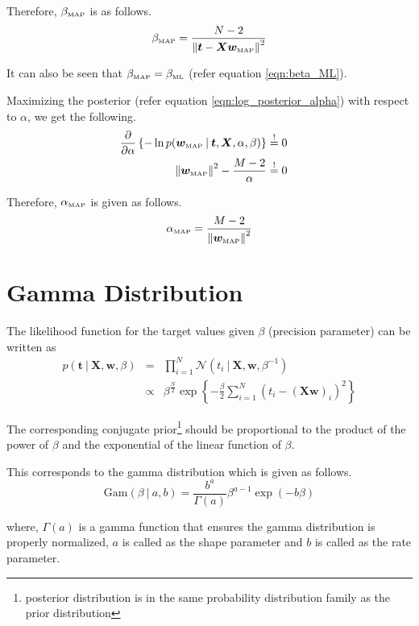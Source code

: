 \documentclass[11pt]{article}
\newcommand{\mle}[1]{{#1}_{\text{\tiny ML}}}
\newcommand{\map}[1]{{#1}_{\text{\tiny MAP}}}
\newcommand\given[1][]{\:#1\vert\:}
\newcommand{\norm}[1]{\left\lVert#1\right\rVert}
\begin{document}
Therefore, $\map{\beta}$ is as follows.
\begin{equation}
    \map{\beta} = \frac{N-2}{\norm{\bm{t} - \bm{X}\map{\bm{w}}}^2}
\end{equation}

It can also be seen that $\map{\beta} = \mle{\beta}$ (refer equation \ref{eqn:beta_ML}).

Maximizing the posterior (refer equation \ref{eqn:log_posterior_alpha}) with respect to $\alpha$, we get the following.
\begin{eqnarray}
    \frac{\partial }{\partial  \alpha} \left\{ -\ln{p(\map{\bm{w}} \given \bm{t}, \bm{X}, \alpha, \beta)} \right\}
    &\overset{!}{=} 0&  \\
    \norm{\map{\bm{w}}}^2 - \frac{M-2}{\alpha}
    &\overset{!}{=} 0& 
\end{eqnarray}

Therefore, $\map{\alpha}$ is given as follows.
\begin{equation}\label{alpha_map}
    \map{\alpha} = \frac{M-2}{\norm{\map{\bm{w}}}^2}
\end{equation}

\section{Gamma Distribution}

The likelihood function for the target values given $\beta$ (precision parameter) can be written as 
\begin{eqnarray}
    p(\bm{t} \given \bm{X}, \bm{w}, \beta) &=& \prod_{i=1}^N \mathcal{N}(t_i \given \bm{X}, \bm{w}, \beta^{-1}) \\
    &\propto& \beta^{\frac{N}{2}}\exp\left\{-\frac{\beta}{2} \sum_{i=1}^N(t_i - (\bm{X}\bm{w})_i)^2 \right\}
\end{eqnarray}

The corresponding conjugate prior\footnote{posterior distribution is in the same probability distribution family as the prior distribution} should be proportional to the product of the power of $\beta$ and the exponential of the linear function of $\beta$. 

This corresponds to the gamma distribution which is given as follows.
\begin{equation} \label{gamma_dist}
    \text{Gam}(\beta \given a, b) = \frac{b^a}{\Gamma(a)}\beta^{a-1}\exp{(-b\beta)}
\end{equation}

where, $\Gamma(a)$ is a gamma function that ensures the gamma distribution is properly normalized, $a$ is called as the shape parameter and $b$ is called as the rate parameter.  
\end{document}
